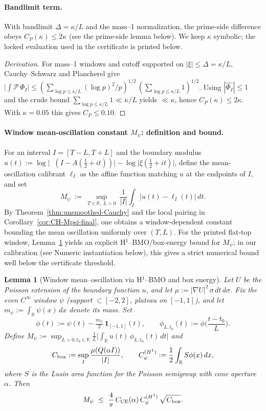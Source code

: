 \documentclass[11pt]{article}
\newtheorem{lemma}[theorem]{Lemma}
\theoremstyle{definition}
\theoremstyle{remark}
\newcommand{\R}{\mathbb{R}}
\DeclareMathOperator{\dettwo}{det_2}
\begin{document}
\paragraph{Bandlimit term.}
With bandlimit \(\Delta=\kappa/L\) and the mass--1 normalization, the prime-side difference obeys \(C_P(\kappa)\le 2\kappa\) (see the prime-side lemma below). We keep \(\kappa\) symbolic; the locked evaluation used in the certificate is printed below.
\begin{proof}[Derivation]
For mass--1 windows and cutoff supported on \(|\xi|\le \Delta=\kappa/L\), Cauchy--Schwarz and Plancherel give
\(\big|\int \mathcal P\,\Phi_I\big|\le (\sum_{\log p\le \kappa/L}(\log p)^2/p)^{1/2}\,(\sum_{\log p\le \kappa/L}1)^{1/2}\). Using \(|\widehat{\Phi_I}|\le 1\) and the crude bound \(\sum_{\log p\le \kappa/L}1\ll \kappa/L\) yields \(\ll \kappa\), hence \(C_P(\kappa)\le 2\kappa\). With \(\kappa=0.05\) this gives \(C_P\le 0.10\).
\end{proof}

\paragraph{Window mean-oscillation constant \(M_\psi\): definition and bound.}
For an interval \(I=[T{-}L,T{+}L]\) and the boundary modulus \(u(t):=\log\big|\dettwo(I{-}A(\tfrac12{+}it))\big|{-}\log\big|\xi(\tfrac12{+}it)\big|\), define the mean-oscillation calibrant \(\ell_I\) as the affine function matching \(u\) at the endpoints of \(I\), and set
\[
  M_\psi\ :=\ \sup_{T\in\R,\ L>0}\ \frac{1}{|I|}\int_I \big|u(t)-\ell_I(t)\big|\,dt.
\]
By Theorem~\ref{thm:unsmoothed-Cauchy} and the local pairing in Corollary~\ref{cor:CH-Mpsi-final}, one obtains a window-dependent constant bounding the mean oscillation uniformly over $(T,L)$. For the printed flat-top window, Lemma~\ref{lem:Mpsi-correct} yields an explicit H$^1$--BMO/box-energy bound for $M_\psi$; in our calibration (see Numeric instantiation below), this gives a strict numerical bound well below the certificate threshold.
\begin{lemma}[Window mean--oscillation via H$^1$--BMO and box energy]\label{lem:Mpsi-correct}
Let $U$ be the Poisson extension of the boundary function $u$, and let $\mu := |\nabla U|^2\,\sigma\,dt\,d\sigma$.
Fix the even $C^\infty$ window $\psi$ (support $\subset[-2,2]$, plateau on $[-1,1]$), and let $m_\psi:=\int_{\R}\psi(x)\,dx$ denote its mass. Set
\[
\phi(t):=\psi(t)-\tfrac{m_\psi}{2}\,\mathbf 1_{[-1,1]}(t),\qquad 
\phi_{L,t_0}(t):=\phi\!\Big(\frac{t-t_0}{L}\Big).
\]
Define $M_\psi:=\sup_{L>0,t_0\in\R}\frac1L\big|\int_\R u(t)\,\phi_{L,t_0}(t)\,dt\big|$ and
\[
C_{\rm box}:=\sup_{I}\frac{\mu(Q(\alpha I))}{|I|},\qquad
C_\psi^{(H^1)}:=\frac12\int_{\R} S\phi(x)\,dx,
\]
where $S$ is the Lusin area function for the Poisson semigroup with cone aperture $\alpha$.
Then
\[
M_\psi\ \le\ \frac{4}{\pi}\,C_{\mathrm{CE}}(\alpha)\,C_\psi^{(H^1)}\,\sqrt{C_{\rm box}}.
\]
\end{lemma}
\end{document}

